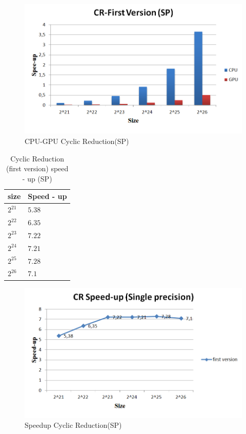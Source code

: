 \begin{figure}[H]
   \centering
       \includegraphics[width=1\textwidth]{grafhmata/cr_first_sp.png}
   \caption{CPU-GPU Cyclic Reduction(SP)}
   \label{fig:CPU-GPU Cyclic Reduction(SP)}
\end{figure}

\begin{table}[H]
\caption{Cyclic Reduction (first version) speed - up (SP)} 
\centering 
\begin{tabular}{| l | p{3cm} |} 
\hline\hline 
size	 & Speed - up  \\  [0.8ex] 
\hline        
        $2^{21}$ & $5.38$      \\ 	
        $2^{22}$ & $6.35$     \\ 	
        $2^{23}$ & $7.22$      \\ 
        $2^{24}$ & $7.21$    \\ 
        $2^{25}$ & $7.28$     \\ 
        $2^{26}$ & $7.1$       \\ [1ex] 
        \hline
\end{tabular}
\label{table:cr_first_spup} 
\end{table}

\begin{figure}[H]
   \centering
       \includegraphics[width=1\textwidth]{grafhmata/cr_first_sp_speedup.png}
   \caption{Speedup Cyclic Reduction(SP)}
   \label{fig:Speedup Cyclic Reduction(SP)}
\end{figure}

